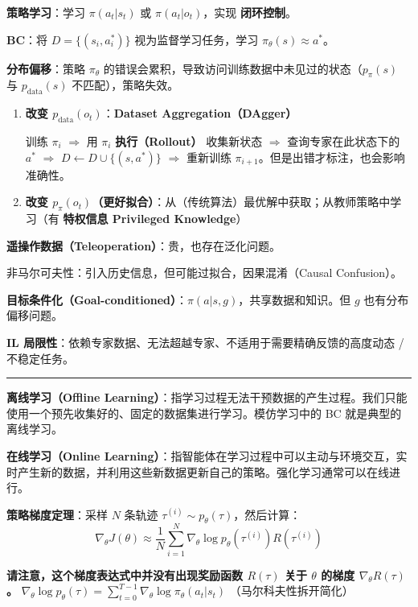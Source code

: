 \documentclass[
  8pt]{extarticle}
\begin{document}
\begin{multicols*}{4}
\textbf{策略学习}：学习 \(\pi(a_t|s_t)\) 或 \(\pi(a_t|o_t)\)，实现
\textbf{闭环控制}。

\textbf{BC}：将 \(D = \{(s_i, a_i^*)\}\) 视为监督学习任务，学习
\(\pi_\theta(s) \approx a^*\)。

\textbf{分布偏移}：策略 \(\pi_\theta\)
的错误会累积，导致访问训练数据中未见过的状态（\(p_\pi(s)\) 与
\(p_{\text{data}}(s)\) 不匹配），策略失效。

\begin{enumerate}
\def\labelenumi{\arabic{enumi}.}
\item
  \textbf{改变 \(p_{\text{data}}(o_t)\)}：\textbf{Dataset
  Aggregation（DAgger）}

  训练 \(\pi_i\) \(\Rightarrow\) 用 \(\pi_i\) \textbf{执行（Rollout）}
  收集新状态 \(\Rightarrow\) 查询专家在此状态下的 \(a^*\)
  \(\Rightarrow\) \(D \leftarrow D \cup \{(s, a^*)\}\) \(\Rightarrow\)
  重新训练 \(\pi_{i+1}\)。但是出错才标注，也会影响准确性。
\item
  \textbf{改变
  \(p_{\pi}(o_t)\)（更好拟合）}：从（传统算法）最优解中获取；从教师策略中学习（有
  \textbf{特权信息 Privileged Knowledge}）
\end{enumerate}

\textbf{遥操作数据（Teleoperation）}：贵，也存在泛化问题。

非马尔可夫性：引入历史信息，但可能过拟合，因果混淆（Causal Confusion）。

\textbf{目标条件化（Goal-conditioned）}：\(\pi(a|s, g)\)，共享数据和知识。但
\(g\) 也有分布偏移问题。

\textbf{IL
局限性}：依赖专家数据、无法超越专家、不适用于需要精确反馈的高度动态 /
不稳定任务。

\begin{center}\rule{0.5\linewidth}{0.5pt}\end{center}

\textbf{离线学习（Offline
Learning）}：指学习过程无法干预数据的产生过程。我们只能使用一个预先收集好的、固定的数据集进行学习。模仿学习中的
BC 就是典型的离线学习。

\textbf{在线学习（Online
Learning）}：指智能体在学习过程中可以主动与环境交互，实时产生新的数据，并利用这些新数据更新自己的策略。强化学习通常可以在线进行。

\textbf{策略梯度定理}：采样 \(N\) 条轨迹
\(\tau^{(i)} \sim p_\theta(\tau)\)，然后计算： \[
\nabla_\theta J(\theta) \approx \frac{1}{N} \sum_{i=1}^{N} \nabla_\theta \log p_\theta(\tau^{(i)}) R(\tau^{(i)})
\]

\textbf{请注意，这个梯度表达式中并没有出现奖励函数 \(R(\tau)\) 关于
\(\theta\) 的梯度 \(\nabla_\theta R(\tau)\)。}
\(\nabla_\theta \log p_\theta(\tau) = \sum_{t=0}^{T-1} \nabla_\theta \log \pi_\theta(a_t | s_t)\)
（马尔科夫性拆开简化）


\end{multicols*}
\end{document}
